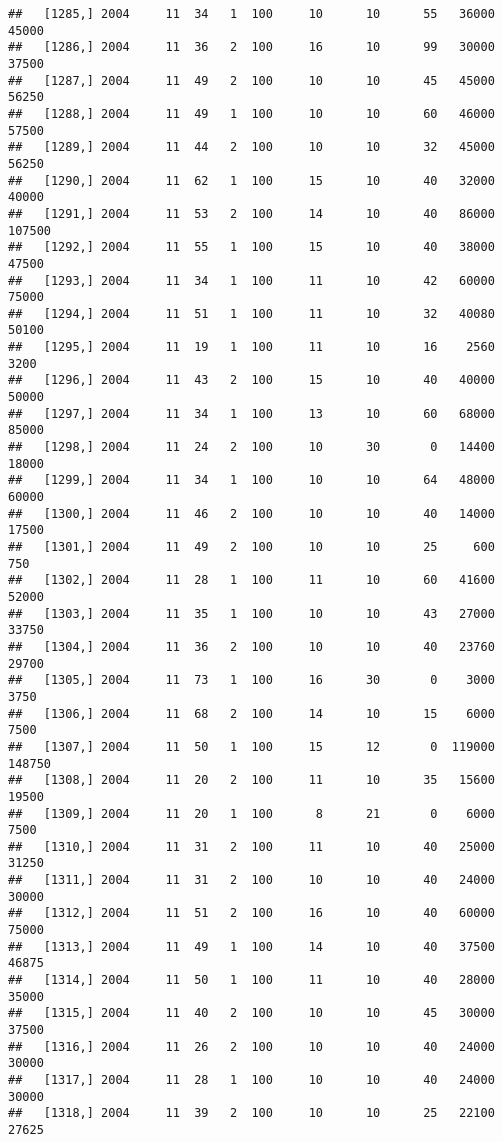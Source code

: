 \documentclass{article}\usepackage[]{graphicx}\usepackage[]{color}
\makeatletter
\newenvironment{kframe}{%
 \def\at@end@of@kframe{}%
 \ifinner\ifhmode%
  \def\at@end@of@kframe{\end{minipage}}%
  \begin{minipage}{\columnwidth}%
 \fi\fi%
 \def\FrameCommand##1{\hskip\@totalleftmargin \hskip-\fboxsep
 \colorbox{shadecolor}{##1}\hskip-\fboxsep
     \hskip-\linewidth \hskip-\@totalleftmargin \hskip\columnwidth}%
 \MakeFramed {\advance\hsize-\width
   \@totalleftmargin\z@ \linewidth\hsize
   \@setminipage}}%
 {\par\unskip\endMakeFramed%
 \at@end@of@kframe}
\newenvironment{knitrout}{}{} %
\makeatother
\begin{document}
\begin{knitrout}
\begin{kframe}
\begin{verbatim}
##   [1285,] 2004     11  34   1  100     10      10      55   36000   45000
##   [1286,] 2004     11  36   2  100     16      10      99   30000   37500
##   [1287,] 2004     11  49   2  100     10      10      45   45000   56250
##   [1288,] 2004     11  49   1  100     10      10      60   46000   57500
##   [1289,] 2004     11  44   2  100     10      10      32   45000   56250
##   [1290,] 2004     11  62   1  100     15      10      40   32000   40000
##   [1291,] 2004     11  53   2  100     14      10      40   86000  107500
##   [1292,] 2004     11  55   1  100     15      10      40   38000   47500
##   [1293,] 2004     11  34   1  100     11      10      42   60000   75000
##   [1294,] 2004     11  51   1  100     11      10      32   40080   50100
##   [1295,] 2004     11  19   1  100     11      10      16    2560    3200
##   [1296,] 2004     11  43   2  100     15      10      40   40000   50000
##   [1297,] 2004     11  34   1  100     13      10      60   68000   85000
##   [1298,] 2004     11  24   2  100     10      30       0   14400   18000
##   [1299,] 2004     11  34   1  100     10      10      64   48000   60000
##   [1300,] 2004     11  46   2  100     10      10      40   14000   17500
##   [1301,] 2004     11  49   2  100     10      10      25     600     750
##   [1302,] 2004     11  28   1  100     11      10      60   41600   52000
##   [1303,] 2004     11  35   1  100     10      10      43   27000   33750
##   [1304,] 2004     11  36   2  100     10      10      40   23760   29700
##   [1305,] 2004     11  73   1  100     16      30       0    3000    3750
##   [1306,] 2004     11  68   2  100     14      10      15    6000    7500
##   [1307,] 2004     11  50   1  100     15      12       0  119000  148750
##   [1308,] 2004     11  20   2  100     11      10      35   15600   19500
##   [1309,] 2004     11  20   1  100      8      21       0    6000    7500
##   [1310,] 2004     11  31   2  100     11      10      40   25000   31250
##   [1311,] 2004     11  31   2  100     10      10      40   24000   30000
##   [1312,] 2004     11  51   2  100     16      10      40   60000   75000
##   [1313,] 2004     11  49   1  100     14      10      40   37500   46875
##   [1314,] 2004     11  50   1  100     11      10      40   28000   35000
##   [1315,] 2004     11  40   2  100     10      10      45   30000   37500
##   [1316,] 2004     11  26   2  100     10      10      40   24000   30000
##   [1317,] 2004     11  28   1  100     10      10      40   24000   30000
##   [1318,] 2004     11  39   2  100     10      10      25   22100   27625

\end{verbatim}
\end{kframe}
\end{knitrout}
\end{document}
